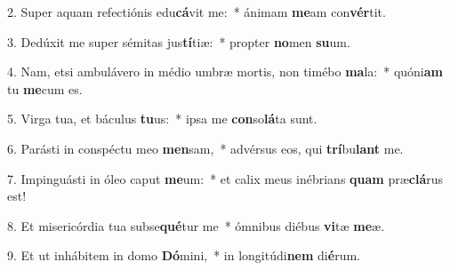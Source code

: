 2. Super aquam refectiónis edu\textbf{cá}vit me:~*  ánimam \textbf{me}am con\textbf{vér}tit.\

3. Dedúxit me super sémitas jus\textbf{tí}tiæ:~*  propter \textbf{no}men \textbf{su}um.\

4. Nam, etsi ambulávero in médio umbræ mortis, non timébo \textbf{ma}la:~*  quóni\textbf{am} tu \textbf{me}cum es.\

5. Virga tua, et báculus \textbf{tu}us:~*  ipsa me \textbf{con}so\textbf{lá}ta sunt.\

6. Parásti in conspéctu meo \textbf{men}sam,~*  advérsus eos, qui \textbf{trí}bu\textbf{lant} me.\

7. Impinguásti in óleo caput \textbf{me}um:~*  et calix meus inébrians \textbf{quam} præ\textbf{clá}rus est!\

8. Et misericórdia tua subse\textbf{qué}tur me~*  ómnibus diébus \textbf{vi}tæ \textbf{me}æ.\

9. Et ut inhábitem in domo \textbf{Dó}mini,~*  in longitúdi\textbf{nem} di\textbf{é}rum.\

